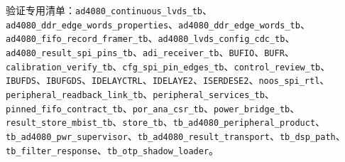 \documentclass[UTF8,fontset=none,zihao=-4,a4paper]{ctexart}
\newcommand{\TraceCode}[1]{\texttt{\mdseries\upshape #1}}
\begin{document}
验证专用清单：\TraceCode{ad4080\_\relax{}continuous\_\penalty150\relax{}lvds\_\relax{}tb}、\allowbreak{}\TraceCode{ad4080\_\penalty150\relax{}ddr\_\penalty150\relax{}edge\_\penalty150\relax{}words\_\penalty150\relax{}properties}、\allowbreak{}\TraceCode{ad4080\_\relax{}ddr\_\penalty150\relax{}edge\_\penalty150\relax{}words\_\relax{}tb}、\allowbreak{}\TraceCode{ad4080\_\penalty150\relax{}fifo\_\penalty150\relax{}record\_\penalty150\relax{}framer\_\relax{}tb}、\allowbreak{}\TraceCode{ad4080\_\penalty150\relax{}lvds\_\penalty150\relax{}config\_\penalty150\relax{}cdc\_\relax{}tb}、\allowbreak{}\TraceCode{ad4080\_\penalty150\relax{}result\_\penalty150\relax{}spi\_\penalty150\relax{}pins\_\relax{}tb}、\allowbreak{}\TraceCode{adi\_\penalty150\relax{}receiver\_\penalty150\relax{}tb}、\allowbreak{}\TraceCode{BUFIO}、\allowbreak{}\TraceCode{BUFR}、\allowbreak{}\TraceCode{calibration\_\relax{}verify\_\relax{}tb}、\allowbreak{}\TraceCode{cfg\_\penalty150\relax{}spi\_\penalty150\relax{}pin\_\penalty150\relax{}edges\_\relax{}tb}、\allowbreak{}\TraceCode{control\_\penalty150\relax{}review\_\penalty150\relax{}tb}、\allowbreak{}\TraceCode{IBUFDS}、\allowbreak{}\TraceCode{IBUFGDS}、\allowbreak{}\TraceCode{IDELAYCTRL}、\allowbreak{}\TraceCode{IDELAYE2}、\allowbreak{}\TraceCode{ISERDESE2}、\allowbreak{}\TraceCode{noos\_\relax{}spi\_\relax{}rtl}、\allowbreak{}\TraceCode{peripheral\_\penalty150\relax{}readback\_\penalty150\relax{}link\_\relax{}tb}、\allowbreak{}\TraceCode{peripheral\_\penalty150\relax{}services\_\relax{}tb}、\allowbreak{}\TraceCode{pinned\_\penalty150\relax{}fifo\_\penalty150\relax{}contract\_\relax{}tb}、\allowbreak{}\TraceCode{por\_\penalty150\relax{}ana\_\penalty150\relax{}csr\_\relax{}tb}、\allowbreak{}\TraceCode{power\_\penalty150\relax{}bridge\_\relax{}tb}、\allowbreak{}\TraceCode{result\_\penalty150\relax{}store\_\penalty150\relax{}mbist\_\relax{}tb}、\allowbreak{}\TraceCode{store\_\relax{}tb}、\allowbreak{}\TraceCode{tb\_\penalty150\relax{}ad4080\_\penalty150\relax{}peripheral\_\penalty150\relax{}product}、\allowbreak{}\TraceCode{tb\_\relax{}ad4080\_\penalty150\relax{}pwr\_\penalty150\relax{}supervisor}、\allowbreak{}\TraceCode{tb\_\relax{}ad4080\_\penalty150\relax{}result\_\penalty150\relax{}transport}、\allowbreak{}\TraceCode{tb\_\relax{}dsp\_\penalty150\relax{}path}、\allowbreak{}\TraceCode{tb\_\relax{}filter\_\penalty150\relax{}response}、\allowbreak{}\TraceCode{tb\_\relax{}otp\_\penalty150\relax{}shadow\_\penalty150\relax{}loader}。\par
\end{document}
